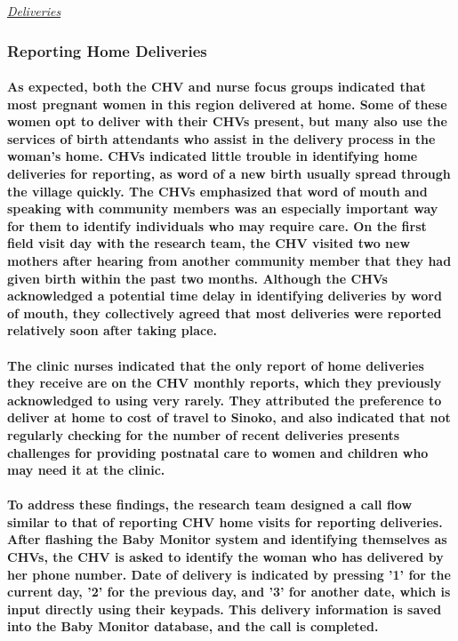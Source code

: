 \underline{\textit{Deliveries}}

\subsubsection{Reporting Home Deliveries}
\paragraph{As expected, both the CHV and nurse focus groups indicated that most pregnant women in this region delivered at home. Some of these women opt to deliver with their CHVs present, but many also use the services of birth attendants who assist in the delivery process in the woman's home. CHVs indicated little trouble in identifying home deliveries for reporting, as word of a new birth usually spread through the village quickly. The CHVs emphasized that word of mouth and speaking with community members was an especially important way for them to identify individuals who may require care. On the first field visit day with the research team, the CHV visited two new mothers after hearing from another community member that they had given birth within the past two months. Although the CHVs acknowledged a potential time delay in identifying deliveries by word of mouth, they collectively agreed that most deliveries were reported relatively soon after taking place.} 

\paragraph{The clinic nurses indicated that the only report of home deliveries they receive are on the CHV monthly reports, which they previously acknowledged to using very rarely. They attributed the preference to deliver at home to cost of travel to Sinoko, and also indicated that not regularly checking for the number of recent deliveries presents challenges for providing postnatal care to women and children who may need it at the clinic.}

\paragraph{To address these findings, the research team designed a call flow similar to that of reporting CHV home visits for reporting deliveries. After flashing the Baby Monitor system and identifying themselves as CHVs, the CHV is asked to identify the woman who has delivered by her phone number. Date of delivery is indicated by pressing '1' for the current day, '2' for the previous day, and '3' for another date, which is input directly using their keypads. This delivery information is saved into the Baby Monitor database, and the call is completed.}

